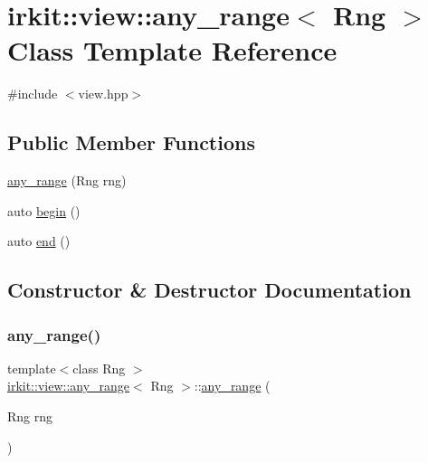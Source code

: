 \hypertarget{classirkit_1_1view_1_1any__range}{}\section{irkit\+:\+:view\+:\+:any\+\_\+range$<$ Rng $>$ Class Template Reference}
\label{classirkit_1_1view_1_1any__range}


{\ttfamily \#include $<$view.\+hpp$>$}

\subsection*{Public Member Functions}
\begin{DoxyCompactItemize}
\item 
\hyperlink{classirkit_1_1view_1_1any__range_ac131324e05db1e661c610ee577c7ac7f}{any\+\_\+range} (Rng rng)
\item 
auto \hyperlink{classirkit_1_1view_1_1any__range_a99da248f7fb3fa9e78300f80ee9c8409}{begin} ()
\item 
auto \hyperlink{classirkit_1_1view_1_1any__range_a192d3e988c56a36695f9ad11c36cb5a6}{end} ()
\end{DoxyCompactItemize}


\subsection{Constructor \& Destructor Documentation}
\mbox{\label{classirkit_1_1view_1_1any__range_ac131324e05db1e661c610ee577c7ac7f}} 
\subsubsection{\texorpdfstring{any\+\_\+range()}{any\_range()}}
{\footnotesize\ttfamily template$<$class Rng $>$ \\
\hyperlink{classirkit_1_1view_1_1any__range}{irkit\+::view\+::any\+\_\+range}$<$ Rng $>$\+::\hyperlink{classirkit_1_1view_1_1any__range}{any\+\_\+range} (\begin{DoxyParamCaption}\item[{Rng}]{rng }\end{DoxyParamCaption})\hspace{0.3cm}{\ttfamily [inline]}}



